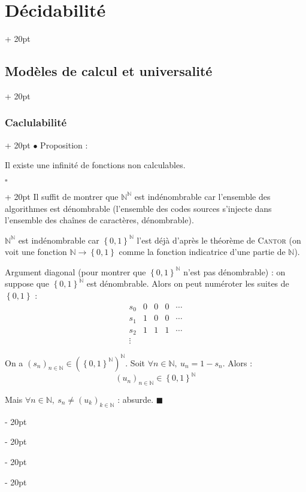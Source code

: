 \documentclass[a4paper, 12pt, twoside]{article}
\newcommand{\N}{\mathbb{N}} %
\newcommand{\lr}[1]{\left( #1 \right)}
\newcommand{\set}[1]{\left\{ #1 \right\}}
\newcommand{\ind}[1][20pt]{\advance\leftskip + #1}
\newcommand{\deind}[1][20pt]{\advance\leftskip - #1}
\newenvironment{indt}[2][20pt]{#2 \par \ind[#1]}{\par \deind} %
\newenvironment{proof}[1][{}]{\begin{indt}{$\square$ #1}}{$\blacksquare$ \end{indt}}
\begin{document}
\begin{indt}{\section{Décidabilité}}
\begin{indt}{\subsection{Modèles de calcul et universalité}}
\begin{indt}{\subsubsection{Caclulabilité}}
                $\bullet$ Proposition :

                \begin{emphBox}
                    Il existe une infinité de fonctions non calculables.
                \end{emphBox}

                \vspace{6pt}
                
                \begin{proof}
                    Il suffit de montrer que $\N^\N$ est indénombrable car l'ensemble des algorithmes est dénombrable (l'ensemble des codes sources s'injecte dans l'ensemble des chaînes de caractères, dénombrable).

                    $\N^\N$ est indénombrable car $\set{0, 1}^\N$ l'est déjà d'après le théorème de \textsc{Cantor} (on voit une fonction $\N \longrightarrow \set{0, 1}$ comme la fonction indicatrice d'une partie de $\N$).

                    \vspace{12pt}
                    
                    Argument diagonal (pour montrer que $\set{0, 1}^\N$ n'est pas dénombrable) : on suppose que $\set{0, 1}^\N$ est dénombrable. Alors on peut numéroter les suites de $\set{0, 1}$ :
                    \[
                        \begin{array}{ccccc}
                            s_0 & 0 & 0 & 0 & \cdots
                            \\
                            s_1 & 1 & 0 & 0 & \cdots
                            \\
                            s_2 & 1 & 1 & 1 & \cdots
                            \\
                            \vdots
                        \end{array}
                    \]

                    On a $\lr{s_n}_{n \in \N} \in \lr{\set{0, 1}^\N}^\N$.
                    Soit $\forall n \in \N,\ u_n = 1 - s_n$. Alors :
                    \[
                        \lr{u_n}_{n \in \N} \in \set{0, 1}^\N
                    \]

                    Mais $\forall n \in \N,\ s_n \neq \lr{u_k}_{k \in \N}$ : absurde.
                \end{proof}
            \end{indt}

            \vspace{12pt}
            

\end{indt}
\end{indt}
\end{document}
